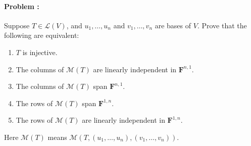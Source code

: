 \paragraph{Problem :}
Suppose \(T \in \mathcal{L}(V)\), and \(u_{1}, \dots, u_{n}\) and \(v_{1}, \dots, v_{n}\) are bases of \(V\). Prove that the following are
equivalent:
\begin{enumerate}[label=(\alph*)]
\item \(T\) is injective.
\item The columns of \(\mathcal{M}(T)\) are linearly independent in \(\mathbf{F}^{n,1}\).
\item The columns of \(\mathcal{M}(T)\) span \(\mathbf{F}^{n,1}\).
\item The rows of \(\mathcal{M}(T)\) span \(\mathbf{F}^{1,n}\).
\item The rows of \(\mathcal{M}(T)\) are linearly independent in \(\mathbf{F}^{1,n}\).
\end{enumerate}

Here \(\mathcal{M}(T)\) means \(\mathcal{M}(T, (u_{1}, \dots, u_{n}), (v_{1}, \dots, v_{n}))\).